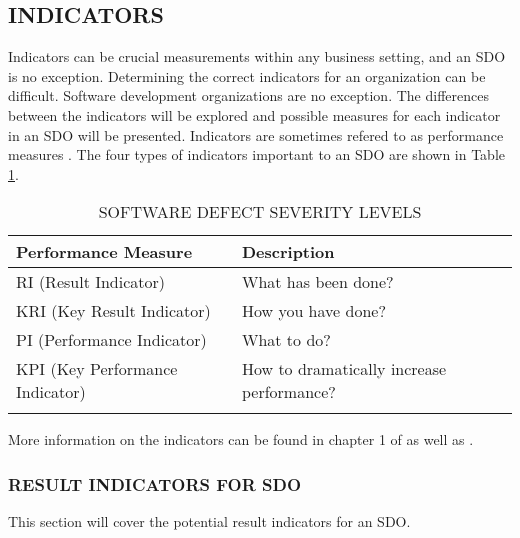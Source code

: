\documentclass[SDSUThesis.tex]{subfiles}
\begin{document}
    \subsection{INDICATORS}
        Indicators can be crucial measurements
        within any business setting, and an SDO is no exception. Determining
        the correct indicators for an organization can
        be difficult.  Software development organizations
        are no exception. 
        The differences between the indicators will be explored and
        possible measures for each indicator in an SDO will be
        presented.  Indicators are sometimes refered to as 
        performance measures \cite{parmenter2010}.  The four
        types of indicators important to an SDO are shown
        in Table \ref{tab:indicators}.
        
        \begin{longtable}{@{}l l}
                \toprule%
                 \centering%
                 {\bfseries Performance Measure}
                 & {\bfseries Description}\\
                
                \cmidrule[0.4pt](r{0.125em}){1-1}%
                \cmidrule[0.4pt](lr{0.125em}){2-2}%
                \endhead
                
                RI (Result Indicator) & What has been done?   \\
                \myrowcolour%
                KRI (Key Result Indicator) & How you have done? \\
                PI (Performance Indicator) & What to do? \\
                \myrowcolour%
                KPI (Key Performance Indicator) & How to dramatically increase performance? \\
                
                \bottomrule
                
                \caption{SOFTWARE DEFECT SEVERITY LEVELS}
                \label{tab:indicators}
            \end{longtable}
        
        More information on the indicators can be found
        in chapter 1 of 
        as well as \cite{florac1999,kaplan1992}.
        
        \subsubsection{RESULT INDICATORS FOR SDO}
            This section will cover the potential result indicators for an SDO.
            
\end{document}
